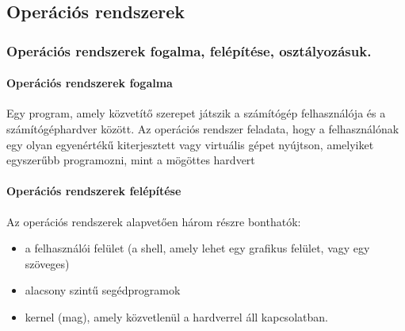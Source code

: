 \subsection{Operációs rendszerek}
\subsubsection{Operációs rendszerek fogalma, felépítése, osztályozásuk.}
\paragraph{Operációs rendszerek fogalma} 
Egy program, amely közvetítő szerepet játszik a számítógép felhasználója
és a számítógéphardver között.
Az operációs rendszer feladata, hogy a felhasználónak egy olyan egyenértékű kiterjesztett
vagy virtuális gépet nyújtson, amelyiket egyszerűbb programozni, mint a mögöttes hardvert
\paragraph{Operációs rendszerek felépítése}
Az operációs rendszerek alapvetően három részre bonthatók:
	\begin{itemize}
	\item a felhasználói felület (a shell, amely lehet egy grafikus felület, vagy egy szöveges)
	\item alacsony szintű segédprogramok
	\item kernel (mag), amely közvetlenül a hardverrel áll kapcsolatban.
	\end{itemize}

